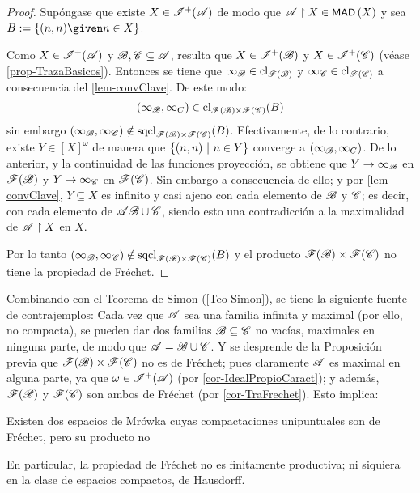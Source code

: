 	\begin{proof} 
		Supóngase que existe $X \in\mathscr{I}^+(\mathscr{A})$ de modo que $\mathscr{A} \upharpoonright X \in \operatorname{\text{\textsf{\small MAD}}}\,(X)$ y sea $B:=\{ (n,n) \given n \in X \}$.

		Como $X \in \mathscr{I}^+(\mathscr{A})$ y $\mathscr{B},\mathscr{C} \subseteq \mathscr{A}$, resulta que $X \in \mathscr{I}^+(\mathscr{B})$ y $X \in \mathscr{I}^+(\mathscr{C})$ (véase \ref{prop-TrazaBasicos}). Entonces se tiene que $\infty_{\mathscr{B}} \in \operatorname{cl}_{\mathscr{F}(\mathscr{B})}$ y $\infty_{\mathscr{C}} \in \operatorname{cl}_{\mathscr{F}(\mathscr{C})}$ a consecuencia del \autoref{lem-convClave}. De este modo:
		$$ (\infty_{\mathscr{B}},\infty_C) \in \operatorname{cl}_{\mathscr{F}(\mathscr{B}) \times \mathscr{F}(\mathscr{C})}(B) $$
		sin embargo $(\infty_{\mathscr{B}},\infty_{\mathscr{C}}) \notin \operatorname{sqcl}_{\mathscr{F}(\mathscr{B}) \times \mathscr{F}(\mathscr{C})}(B)$. Efectivamente, de lo contrario, existe $Y \in [X]^\omega$ de manera que $\{(n,n) \text{ $|$ } n \in Y\}$ converge a $ (\infty_{\mathscr{B}},\infty_C)$. De lo anterior, y la continuidad de las funciones proyección, se obtiene que $Y \to \infty_{\mathscr{B}}$ en $\mathscr{F}(\mathscr{B})$ y $Y \to \infty_{\mathscr{C}}$ en $\mathscr{F}(\mathscr{C})$. Sin embargo a consecuencia de ello; y por \ref{lem-convClave}, $Y \subseteq X$ es infinito y casi ajeno con cada elemento de $\mathscr{B}$ y $\mathscr{C}$; es decir, con cada elemento de $\mathscr{A}\mathscr{B} \cup \mathscr{C}$, siendo esto una contradicción a la maximalidad de $\mathscr{A} \upharpoonright X$ en $X$.

		Por lo tanto $(\infty_{\mathscr{B}},\infty_{\mathscr{C}}) \notin \operatorname{sqcl}_{\mathscr{F}(\mathscr{B}) \times \mathscr{F}(\mathscr{C})}(B)$ y el producto $\mathscr{F}(\mathscr{B}) \times \mathscr{F}(\mathscr{C})$ no tiene la propiedad de Fréchet.
	\end{proof}
	
	Combinando con el Teorema de Simon (\ref{Teo-Simon}), se tiene la siguiente fuente de contrajemplos: Cada vez que $\mathscr{A}$ sea una familia infinita y maximal (por ello, no compacta), se pueden dar dos familias $\mathscr{B} \subseteq \mathscr{C}$ no vacías, maximales en ninguna parte, de modo que $\mathscr{A}=\mathscr{B} \cup \mathscr{C}$. Y se desprende de la Proposición previa que $\mathscr{F}(\mathscr{B}) \times \mathscr{F}(\mathscr{C})$ no es de Fréchet; pues claramente $\mathscr{A}$ es maximal en alguna parte, ya que $\omega \in \mathscr{I}^+(\mathscr{A})$ (por \ref{cor-IdealPropioCaract}); y además, $\mathscr{F}(\mathscr{B})$ y $\mathscr{F}(\mathscr{C})$ son ambos de Fréchet (por \ref{cor-TraFrechet}). Esto implica:

	\begin{corolario}\label{cor-FrechNoProd}
		Existen dos espacios de Mrówka cuyas compactaciones unipuntuales son de Fréchet, pero su producto no

		En particular, la propiedad de Fréchet no es finitamente productiva; ni siquiera en la clase de espacios compactos, de Hausdorff.
	\end{corolario}

